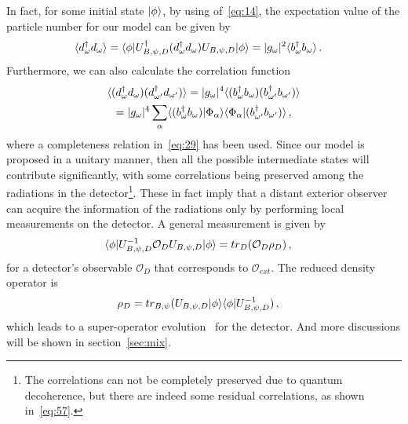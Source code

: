 \documentclass[12pt,a4paper]{article}
\begin{document}
In fact, for some initial state $\arrowvert\phi\rangle$, by using of~\eqref{eq:14}, the expectation value of the
particle number for our model can be given by
\begin{equation}
\label{eq:21}
\begin{split}
\langle d_{\omega}^{\dag}d_{\omega}\rangle &= \langle\phi\arrowvert
U_{B,\psi,D}^{\dag}(d_{\omega}^{\dag}d_{\omega})U_{B,\psi,D}\arrowvert\phi\rangle=|g_{\omega}|^2\langle
b_{\omega}^{\dag}b_{\omega}\rangle \,.
\end{split}
\end{equation}
Furthermore, we can also calculate the correlation function
\begin{multline}
\label{eq:22}
\langle(d_{\omega}^{\dag}d_{\omega})(d_{\omega'}^{\dag}d_{\omega'})\rangle=|g_{\omega}|^4\langle(b_{\omega}^{\dag}b_{\omega})(b_{\omega'}^{\dag}b_{\omega'})\rangle\\
=|g_{\omega}|^4\sum_{\alpha}\langle(b_{\omega}^{\dag}b_{\omega})\arrowvert\Phi_{\alpha}\rangle\langle\Phi_{\alpha}\arrowvert(b_{\omega'}^{\dag}b_{\omega'})\rangle
\,,
\end{multline}
where a completeness relation in~\eqref{eq:29} has been used. Since our
model is proposed in a unitary manner, then all the possible intermediate states will contribute
significantly, with some correlations being preserved among the radiations in the detector\footnote{The
correlations can not be completely preserved due to quantum
decoherence, but there are indeed some residual correlations, as
shown in~\eqref{eq:57}.}. These in fact imply that a distant exterior observer can acquire the information of the
radiations only by performing local
measurements on the detector. A general measurement is given by
\begin{equation}
\label{eq:23}
\begin{split}
\langle\phi\arrowvert U_{B,\psi,D}^{-1}\mathcal{O}_{D}U_{B,\psi,D}\arrowvert\phi\rangle &= tr_{D}(\mathcal{O}_{D}\rho_{D}) \,,
\end{split}
\end{equation}
for a detector's observable $\mathcal{O}_{D}$ that corresponds to $\mathcal{O}_{ext}$. The reduced density operator is
\begin{equation}
\label{eq:24}
\begin{split}
\rho_{D} &=
tr_{B,\psi}(U_{B,\psi,D}\arrowvert\phi\rangle\langle\phi\arrowvert
U_{B,\psi,D}^{-1}) \,,
\end{split}
\end{equation}
which leads to a super-operator evolution~\cite{i}
for the detector. And more discussions will be shown in section~\ref{sec:mix}.
\end{document}
